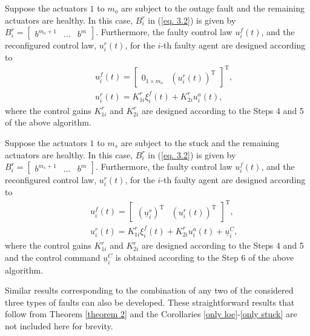\documentclass[12pt,draftcls,onecolumn]{IEEEtran}
\begin{document}
\begin{corollaries}\label{outage}
Suppose the actuators $1$ to $m_o$ are subject to the outage fault and the remaining actuators are healthy. In this case, $B_i^r$ in  (\ref{eq. 3.2}) is given by  $B_i^r=\begin{bmatrix}b^{m_o+1}&\dots&b^m\end{bmatrix}$. Furthermore,  the faulty control law $u_i^f(t)$, and the reconfigured control law, $u_i^r(t)$,  for the $i$-th faulty agent  are designed according to
 \begin{eqnarray*}
&&u_i^f(t)=\begin{bmatrix}0_{1\times m_o}&(u_i^r(t))^\text{T}\end{bmatrix}^\text{T},\\
 &&u_i^r(t)=K_{1i}^r\xi_i^f(t)+K_{2i}^ru_i^a(t),
 \end{eqnarray*}
 where the control gains $K_{1i}^r$ and $K_{2i}^r$ are designed according to the Steps 4 and 5 of the above algorithm. 
\end{corollaries}
\begin{corollaries} \label{only stuck}
Suppose the actuators $1$ to $m_s$ are subject to the stuck and the remaining actuators are healthy. In this case, $B_i^r$ in  (\ref{eq. 3.2}) is given by  $B_i^r=\begin{bmatrix}b^{m_s+1}&\dots&b^m\end{bmatrix}$. Furthermore,  the faulty control law $u_i^f(t)$, and the reconfigured control law, $u_i^r(t)$,  for the $i$-th faulty agent  are designed according to  
 \begin{eqnarray*}
&&u_i^f(t)=\begin{bmatrix}(\underline u_i^s)^\text{T}&(u_i^r(t))^\text{T}\end{bmatrix}^\text{T},\\
&&u_i^r(t)=K_{1i}^r\xi_i^f(t)+K_{2i}^ru_i^a(t)+\underline{u}_i^C,
\end{eqnarray*}
 where the control gains $K_{1i}^r$ and $K_{2i}^r$ are designed according to the Steps 4 and 5 and the control command $\underline{u}_i^C$ is obtained according to the Step 6 of the above algorithm. 
\end{corollaries}
Similar results corresponding to the combination of any two of the considered three types of faults can also be developed. These straightforward results that follow from Theorem \ref{theorem 2} and the Corollaries \ref{only loe}-\ref{only stuck} are not included here for brevity.
\end{document}
